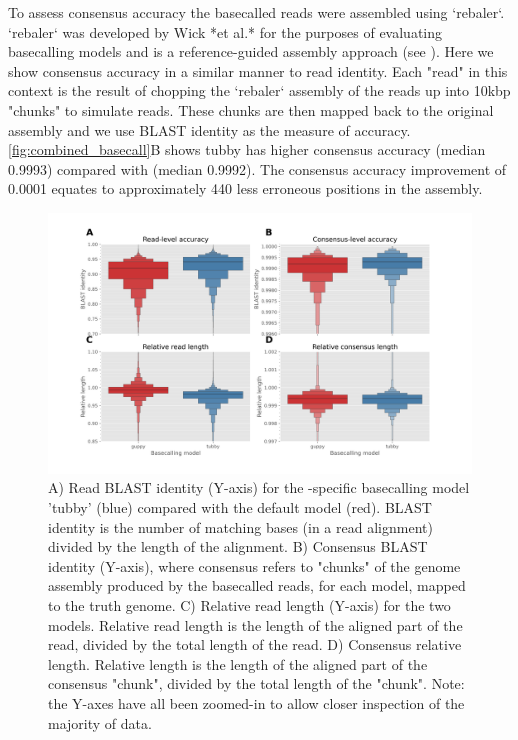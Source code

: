 \begin{markdown}
To assess consensus accuracy the basecalled reads were assembled using `rebaler`. `rebaler` was developed by Wick *et al.* for the purposes of evaluating basecalling models and is a reference-guided assembly approach (see ). Here we show consensus accuracy in a similar manner to read identity. Each "read" in this context is the result of chopping the `rebaler` assembly of the reads up into 10kbp "chunks" to simulate reads. These chunks are then mapped back to the original assembly and we use BLAST identity as the measure of accuracy. \autoref{fig:combined_basecall}B shows tubby has higher consensus accuracy (median 0.9993) compared with \guppy{} (median 0.9992). The consensus accuracy improvement of 0.0001 equates to approximately 440 less erroneous positions in the \mtb{} assembly.

\end{markdown}

\begin{figure}
\includegraphics[width=1.0\textwidth]{Chapter2/Figs/combined_identity_relative_len.png}
\centering
\caption{A) Read BLAST identity (Y-axis) for the \mtb{}-specific basecalling model 'tubby' (blue) compared with the default \guppy{} model (red). BLAST identity is the number of matching bases (in a read alignment) divided by the length of the alignment. B) Consensus BLAST identity (Y-axis), where consensus refers to "chunks" of the genome assembly produced by the basecalled reads, for each model, mapped to the truth genome. C) Relative read length (Y-axis) for the two models. Relative read length is the length of the aligned part of the read, divided by the total length of the read. D) Consensus relative length. Relative length is the length of the aligned part of the consensus "chunk", divided by the total length of the "chunk". Note: the Y-axes have all been zoomed-in to allow closer inspection of the majority of data.}
\label{fig:combined_basecall}
\end{figure}

